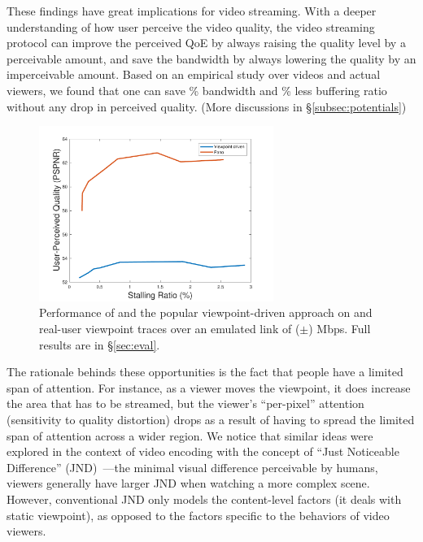 These findings
have great implications for \vr video streaming. 
With a deeper understanding of how user perceive the video quality, the video streaming protocol can improve the perceived QoE by always raising the quality level by a perceivable amount, and save the bandwidth by always lowering the quality by an imperceivable amount. 
Based on an empirical study over \fillme \vr videos and \fillme actual viewers, we found that one can save \fillme\% bandwidth and \fillme\% less buffering ratio without any drop in perceived quality. (More discussions in \S\ref{subsec:potentials})


\begin{figure}
  \centering
  \includegraphics[width=3in]{images/intro-result.pdf}
  \caption{Performance of \name and the popular viewpoint-driven approach on \fillme \vrvideos and \fillme real-user viewpoint traces over an emulated link of \fillme($\pm$\fillme) Mbps.
  Full results are in \S\ref{sec:eval}.}
  \label{first_image}
\end{figure}


The rationale behinds these opportunities is the fact that people have a limited span of attention.
For instance, as a viewer moves the viewpoint, it does increase the area that has to be streamed, but the viewer's ``per-pixel'' attention  (\ie sensitivity to quality distortion) drops as a result of having to spread the limited span of attention across a wider region.
We notice that similar ideas were explored in the context of video encoding with the concept of ``Just Noticeable Difference'' (JND)~\cite{??,??,??}---the minimal visual difference perceivable by humans, \eg viewers generally have larger JND when watching a more complex scene. 
However, conventional JND only models the content-level factors (it deals with static viewpoint), as opposed to the factors specific to the behaviors of \vr video viewers. 

